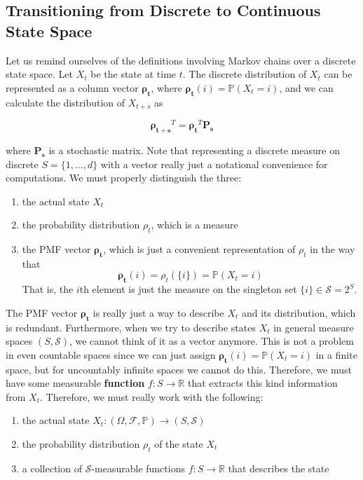 \documentclass{article}
\begin{document}
  \subsection{Transitioning from Discrete to Continuous State Space}

    Let us remind ourselves of the definitions involving Markov chains over a discrete state space. Let $X_t$ be the state at time $t$. The discrete distribution of $X_t$ can be represented as a column vector $\boldsymbol{\rho_t}$, where $\boldsymbol{\rho_t} (i) = \mathbb{P}(X_t = i)$, and we can calculate the distribution of $X_{t + s}$ as 

      \[\boldsymbol{\rho_{t + s}}^T = \boldsymbol{\rho_{t}}^T \boldsymbol{P_s} \]

    where $\boldsymbol{P_s}$ is a stochastic matrix. Note that representing a discrete measure on discrete $S = \{1, \ldots, d\}$ with a vector really just a notational convenience for computations. We must properly distinguish the three: 

    \begin{enumerate}
      \item the actual state $X_t$ 
      \item the probability distribution $\rho_t$, which is a measure 
      \item the PMF vector $\boldsymbol{\rho_t}$, which is just a convenient representation of $\rho_t$ in the way that 
      \[\boldsymbol{\rho_t} (i) = \rho_t (\{i\}) = \mathbb{P}(X_t = i)\]
      That is, the $i$th element is just the measure on the singleton set $\{i\} \in \mathcal{S} = 2^S$. 
    \end{enumerate}

    The PMF vector $\boldsymbol{\rho_t}$ is really just a way to describe $X_t$ and its distribution, which is redundant. Furthermore, when we try to describe states $X_t$ in general measure spaces $(S, \mathcal{S})$, we cannot think of it as a vector anymore. This is not a problem in even countable spaces since we can just assign $\boldsymbol{\rho_t} (i) = \mathbb{P}(X_t = i)$ in a finite space, but for uncountably infinite spaces we cannot do this. Therefore, we must have some measurable \textbf{function} $f: S \rightarrow \mathbb{R}$ that extracts this kind information from $X_{t}$. Therefore, we must really work with the following: 

    \begin{enumerate}
      \item the actual state $X_t: (\Omega, \mathcal{F}, \mathbb{P}) \longrightarrow (S, \mathcal{S})$ 
      \item the probability distribution $\rho_t$ of the state $X_t$ 
      \item a collection of $\mathcal{S}$-measurable functions $f: S \longrightarrow \mathbb{R}$ that describes the state 
    \end{enumerate}
\end{document}
